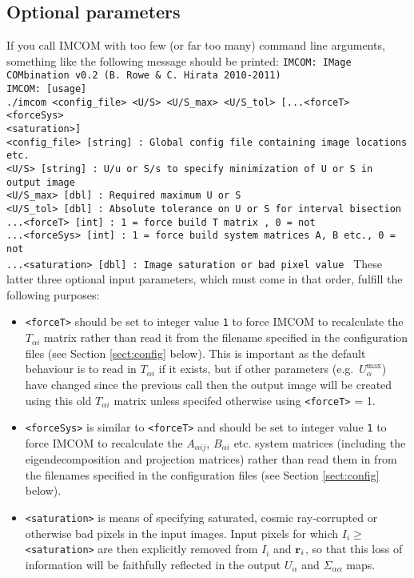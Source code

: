 \documentclass[10pt]{article}
\begin{document}
\subsection{Optional parameters}
If you call IMCOM with too few (or far too many) command line arguments, something like the following message should be printed:
\newline \newline
\texttt{IMCOM: IMage COMbination v0.2 (B. Rowe \& C. Hirata 2010-2011) \\
IMCOM: [usage] \\
 ./imcom <config\_file> <U/S> <U/S\_max> <U/S\_tol> [...<forceT> <forceSys> \\ <saturation>] \\
 \newline
  <config\_file> [string] : Global config file containing image locations etc. \\
  <U/S> [string] : U/u or S/s to specify minimization of U or S in output image \\
  <U/S\_max> [dbl]         : Required maximum U or S \\
  <U/S\_tol> [dbl]         : Absolute tolerance on U or S for interval bisection \\
 ...<forceT> [int]           : 1 = force build T matrix , 0 = not                 \\
   ...<forceSys> [int]      : 1 = force build system matrices A, B etc., 0 = not  \\
   ...<saturation> [dbl] : Image saturation or bad pixel value                 }
\newline \newline
These latter three optional input parameters, which must come in that order, fulfill the following purposes:
\begin{itemize}
\item \texttt{<forceT>} should be set to integer value \texttt{1} to force IMCOM to recalculate the $T_{\alpha i}$ matrix rather than read it from the filename specified in the configuration files (see Section \ref{sect:config} below).  This is important as the default behaviour is to read in $T_{\alpha i }$ if it exists, but if other parameters (e.g.\ $U_{\alpha}^{\textrm{max}}$) have changed since the previous call then the output image will be created using this old $T_{\alpha i}$ matrix unless specifed otherwise using \texttt{<forceT>} = 1.
\item \texttt{<forceSys>} is similar to \texttt{<forceT>} and should be set to integer value \texttt{1} to force IMCOM to recalculate the $A_{\alpha ij}$, $B_{\alpha i}$ etc. system matrices (including the eigendecomposition and projection matrices) rather than read them in from the filenames specified in the configuration files (see Section \ref{sect:config} below). 
\item \texttt{<saturation>} is means of specifying saturated, cosmic ray-corrupted or otherwise bad pixels in the input images.  Input pixels for which $I_i \ge $ \texttt{<saturation>} are then explicitly removed from $I_i$ and ${\bf r}_i$, so that this loss of information will be faithfully reflected in the output $U_{\alpha}$ and $\Sigma_{\alpha \alpha}$ maps.
\end{itemize}
\end{document}
